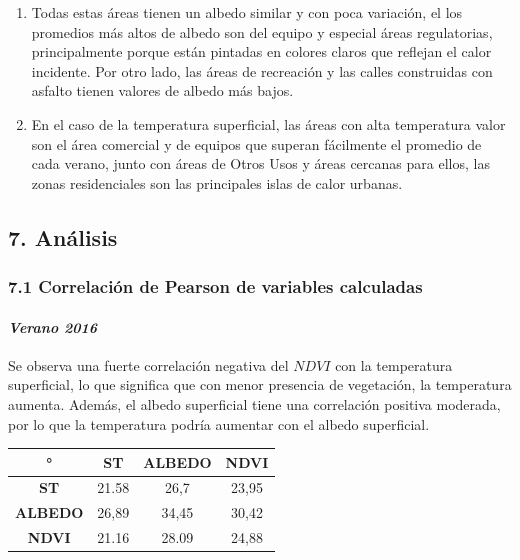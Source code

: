 \documentclass[
]{article}
\begin{document}
\begin{enumerate}
\def\labelenumi{\alph{enumi})}
\setcounter{enumi}{1}
\item
  Todas estas áreas tienen un albedo similar y con poca variación, el
  los promedios más altos de albedo son del equipo y especial áreas
  regulatorias, principalmente porque están pintadas en colores claros
  que reflejan el calor incidente. Por otro lado, las áreas de
  recreación y las calles construidas con asfalto tienen valores de
  albedo más bajos.
\item
  En el caso de la temperatura superficial, las áreas con alta
  temperatura valor son el área comercial y de equipos que superan
  fácilmente el promedio de cada verano, junto con áreas de Otros Usos y
  áreas cercanas para ellos, las zonas residenciales son las principales
  islas de calor urbanas.
\end{enumerate}

\hypertarget{anuxe1lisis}{%
\subsection{7. Análisis}\label{anuxe1lisis}}

\hypertarget{correlaciuxf3n-de-pearson-de-variables-calculadas}{%
\subsubsection{7.1 Correlación de Pearson de variables
calculadas}\label{correlaciuxf3n-de-pearson-de-variables-calculadas}}

\hypertarget{verano-2016}{%
\paragraph{\texorpdfstring{\emph{Verano
2016}}{Verano 2016}}\label{verano-2016}}

Se observa una fuerte correlación negativa del \(NDVI\) con la
temperatura superficial, lo que significa que con menor presencia de
vegetación, la temperatura aumenta. Además, el albedo superficial tiene
una correlación positiva moderada, por lo que la temperatura podría
aumentar con el albedo superficial.

\begin{longtable}[]{@{}cccc@{}}
\toprule
° & ST & ALBEDO & NDVI\tabularnewline
\midrule
\endhead
\textbf{ST} & 21.58 & 26,7 & 23,95\tabularnewline
\textbf{ALBEDO} & 26,89 & 34,45 & 30,42\tabularnewline
\textbf{NDVI} & 21.16 & 28.09 & 24,88\tabularnewline
\bottomrule
\end{longtable}
\end{document}

